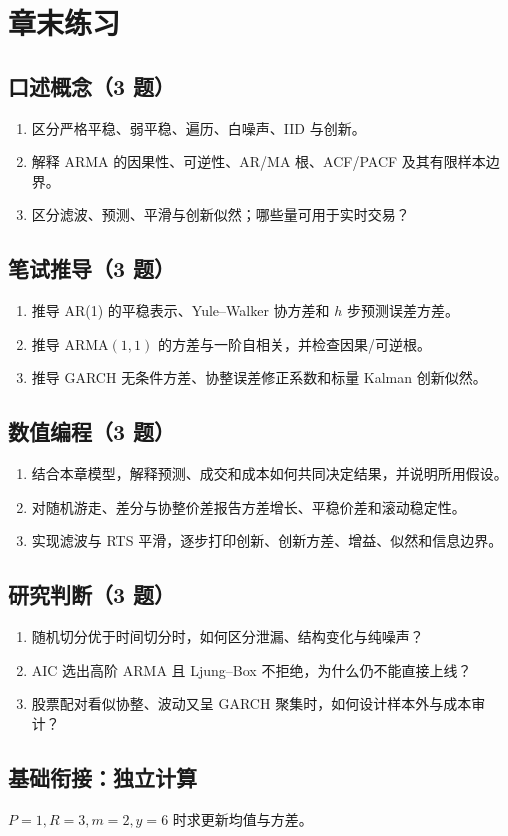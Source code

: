 \section*{章末练习}
\begingroup\small
\subsection*{口述概念（3 题）}
\begin{enumerate}[nosep,leftmargin=*]
\item 区分严格平稳、弱平稳、遍历、白噪声、IID 与创新。
\item 解释 ARMA 的因果性、可逆性、AR/MA 根、ACF/PACF 及其有限样本边界。
\item 区分滤波、预测、平滑与创新似然；哪些量可用于实时交易？
\end{enumerate}
\subsection*{笔试推导（3 题）}
\begin{enumerate}[nosep,leftmargin=*,start=4]
\item 推导 AR(1) 的平稳表示、Yule--Walker 协方差和 $h$ 步预测误差方差。
\item 推导 ARMA$(1,1)$ 的方差与一阶自相关，并检查因果/可逆根。
\item 推导 GARCH 无条件方差、协整误差修正系数和标量 Kalman 创新似然。
\end{enumerate}
\subsection*{数值编程（3 题）}
\begin{enumerate}[nosep,leftmargin=*,start=7]
\item 结合本章模型，解释预测、成交和成本如何共同决定结果，并说明所用假设。
\item 对随机游走、差分与协整价差报告方差增长、平稳价差和滚动稳定性。
\item 实现滤波与 RTS 平滑，逐步打印创新、创新方差、增益、似然和信息边界。
\end{enumerate}
\subsection*{研究判断（3 题）}
\begin{enumerate}[nosep,leftmargin=*,start=10]
\item 随机切分优于时间切分时，如何区分泄漏、结构变化与纯噪声？
\item AIC 选出高阶 ARMA 且 Ljung--Box 不拒绝，为什么仍不能直接上线？
\item 股票配对看似协整、波动又呈 GARCH 聚集时，如何设计样本外与成本审计？
\end{enumerate}
\endgroup

\subsection*{基础衔接：独立计算}
$P=1,R=3,m=2,y=6$ 时求更新均值与方差。

